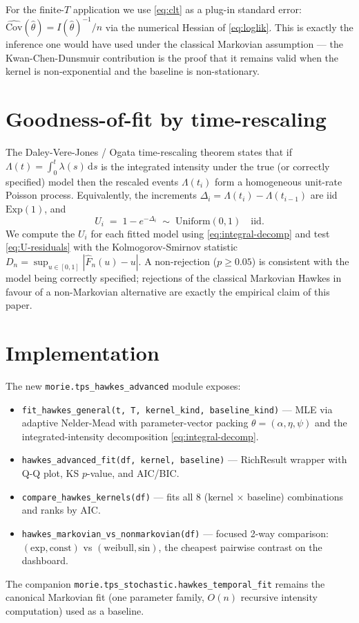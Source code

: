 \documentclass[article,shortnames,nojss]{jss}
\newcommand{\rmd}{\,\mathrm{d}}
\newcommand{\1}{\mathbbm{1}}
\theoremstyle{plain}
\theoremstyle{definition}
\begin{document}
For the finite-$T$ application we use \eqref{eq:clt} as a
plug-in standard error: $\widehat{\mathrm{Cov}}(\hat\theta) =
I(\hat\theta)^{-1}/n$ via the numerical Hessian of \eqref{eq:loglik}.
This is exactly the inference one would have used under the
classical Markovian assumption --- the Kwan-Chen-Dunsmuir
contribution is the proof that it remains valid when the kernel is
non-exponential and the baseline is non-stationary.

\section{Goodness-of-fit by time-rescaling}\label{sec:gof}

The Daley-Vere-Jones / Ogata time-rescaling theorem
\citep{Daley2003,ogata1988statistical,BrownEtAl2002} states that if $\Lambda(t) =
\int_0^t \lambda(s) \rmd s$ is the integrated intensity under the
true (or correctly specified) model then the rescaled events
$\Lambda(t_i)$ form a homogeneous unit-rate Poisson process.
Equivalently, the increments $\Delta_i = \Lambda(t_i) -
\Lambda(t_{i-1})$ are iid $\mathrm{Exp}(1)$, and
\begin{equation}\label{eq:U-residuals}
  U_i \;=\; 1 - e^{-\Delta_i}
  \;\sim\; \mathrm{Uniform}(0,1)\quad\text{iid}.
\end{equation}
We compute the $U_i$ for each fitted model using
\eqref{eq:integral-decomp} and test \eqref{eq:U-residuals} with the
Kolmogorov-Smirnov statistic
$D_n = \sup_{u\in[0,1]} |\hat F_n(u) - u|$.  A non-rejection
($p \ge 0.05$) is consistent with the model being correctly
specified; rejections of the classical Markovian Hawkes in favour
of a non-Markovian alternative are exactly the empirical claim of
this paper.

\section{Implementation}\label{sec:implementation}

The new \texttt{morie.tps\_hawkes\_advanced} module exposes:
\begin{itemize}
\setlength{\itemsep}{1pt}
  \item \texttt{fit\_hawkes\_general(t, T, kernel\_kind, baseline\_kind)}
    --- MLE via adaptive Nelder-Mead with parameter-vector packing
    $\theta = (\alpha,\eta,\psi)$ and the integrated-intensity
    decomposition \eqref{eq:integral-decomp}.
  \item \texttt{hawkes\_advanced\_fit(df, kernel, baseline)} --- RichResult
    wrapper with Q-Q plot, KS $p$-value, and AIC/BIC.
  \item \texttt{compare\_hawkes\_kernels(df)} --- fits all 8
    (kernel $\times$ baseline) combinations and ranks by AIC.
  \item \texttt{hawkes\_markovian\_vs\_nonmarkovian(df)} --- focused
    2-way comparison: $(\text{exp},\text{const})$ vs
    $(\text{weibull},\text{sin})$, the cheapest pairwise contrast on
    the dashboard.
\end{itemize}
The companion \texttt{morie.tps\_stochastic.hawkes\_temporal\_fit}
remains the canonical Markovian fit (one parameter family,
$O(n)$ recursive intensity computation) used as a baseline.
\end{document}
